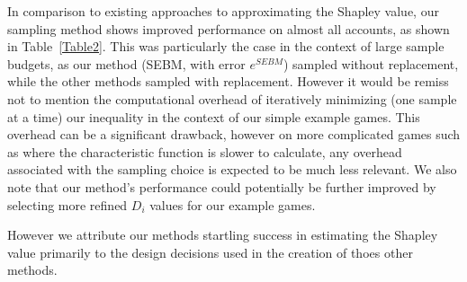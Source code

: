 In comparison to existing approaches to approximating the Shapley value, our sampling method shows improved performance on almost all accounts, as shown in Table~\ref{Table2}.
This was particularly the case in the context of large sample budgets, as our method (SEBM, with error $e^{SEBM}$) sampled without replacement, while the other methods sampled with replacement. 
However it would be remiss not to mention the computational overhead of iteratively minimizing (one sample at a time) our inequality in the context of our simple example games. 
This overhead can be a significant drawback, however on more complicated games such as where the characteristic function is slower to calculate, any overhead associated with the sampling choice is expected to be much less relevant. 
We also note that our method's performance could potentially be further improved by selecting more refined $D_i$ values for our example games.

However we attribute our methods startling success in estimating the Shapley value primarily to the design decisions used in the creation of thoes other methods.

% 


%


